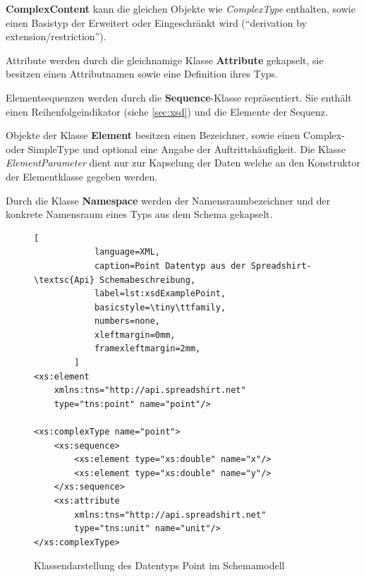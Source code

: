 \textbf{ComplexContent} kann die gleichen Objekte wie \emph{ComplexType} enthalten, sowie einen Basistyp der Erweitert oder Eingeschränkt wird (\enquote{derivation by extension/restriction}).

Attribute werden durch die gleichnamige Klasse \textbf{Attribute} gekapselt, sie besitzen einen Attributnamen sowie eine Definition ihres Typs.

Elementsequenzen werden durch die \textbf{Sequence}-Klasse repräsentiert. Sie enthält einen Reihenfolgeindikator (siehe \cref{sec:xsd}) und die Elemente der Sequenz.

Objekte der Klasse \textbf{Element} besitzen einen Bezeichner, sowie einen Complex- oder SimpleType und optional eine Angabe der Auftrittshäufigkeit. Die Klasse \emph{ElementParameter} dient nur zur Kapselung der Daten welche an den Konstruktor der Elementklasse gegeben werden.

Durch die Klasse \textbf{Namespace} werden der Namensraumbezeichner und der konkrete Namensraum eines Typs aus dem Schema gekapselt. 


\begin{figure}[ht]
    \centering
    \begin{minipage}[b]{0.50\linewidth}
        \begin{lstlisting}[
            language=XML,
            caption=Point Datentyp aus der Spreadshirt-\textsc{Api} Schemabeschreibung,
            label=lst:xsdExamplePoint,    
            basicstyle=\tiny\ttfamily,
            numbers=none,
            xleftmargin=0mm,
            framexleftmargin=2mm,
        ]
<xs:element 
    xmlns:tns="http://api.spreadshirt.net" 
    type="tns:point" name="point"/>

<xs:complexType name="point">
    <xs:sequence>
        <xs:element type="xs:double" name="x"/>
        <xs:element type="xs:double" name="y"/>
    </xs:sequence>
    <xs:attribute 
        xmlns:tns="http://api.spreadshirt.net" 
        type="tns:unit" name="unit"/>
</xs:complexType>
        \end{lstlisting}
    \end{minipage}
    \quad    
    \begin{minipage}[b]{0.45\linewidth}
        \caption{Klassendarstellung des Datentyps Point im Schemamodell}
    \end{minipage}
\end{figure}